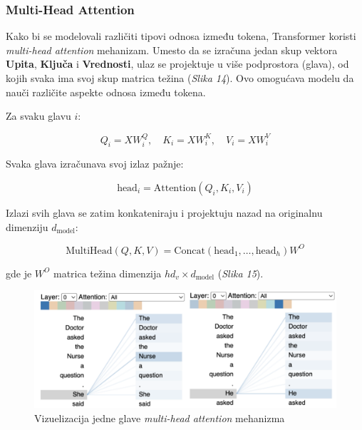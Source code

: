 \documentclass[12pt]{article}
\begin{document}
   \subsubsection*{Multi-Head Attention}
   Kako bi se modelovali različiti tipovi odnosa između tokena, Transformer koristi 
   \textit{multi-head attention} mehanizam. Umesto da se izračuna jedan skup vektora 
   \textbf{Upita}, \textbf{Ključa} i \textbf{Vrednosti}, ulaz se projektuje u više 
   podprostora (glava), od kojih svaka ima svoj skup matrica težina (\textit{Slika 14}). Ovo omogućava modelu da 
   nauči različite aspekte odnosa između tokena.

   Za svaku glavu \( i \):

   \[
   Q_i = XW_i^Q, \quad K_i = XW_i^K, \quad V_i = XW_i^V
   \]

   Svaka glava izračunava svoj izlaz pažnje:

   \[
   \text{head}_i = \text{Attention}(Q_i, K_i, V_i)
   \]

   Izlazi svih glava se zatim konkateniraju i projektuju nazad na originalnu 
   dimenziju \( d_{\text{model}} \):

   \[
   \text{MultiHead}(Q, K, V) = \text{Concat}(\text{head}_1, \dots, \text{head}_h)W^O
   \]

   gde je \( W^O \) matrica težina dimenzija \( hd_v \times d_{\text{model}} \) (\textit{Slika 15}).

   \begin{figure}[h!]
      \centering
      \vspace{0.5cm} %
      \includegraphics[width=1\textwidth]{attention_head.png}
      \caption{Vizuelizacija jedne glave \textit{multi-head attention} mehanizma \cite{attention_head}}
      \label{fig:attention_head}
   \end{figure}
\end{document}
